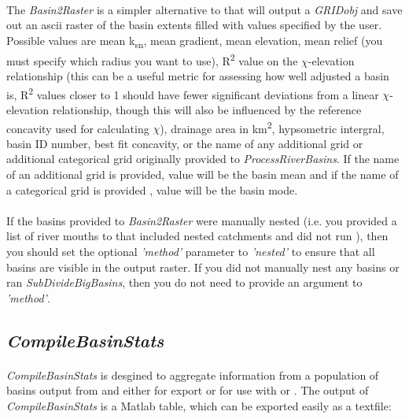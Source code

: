 \paragraph{}The \textit{Basin2Raster} is a simpler alternative to  that will output a \textit{GRIDobj} and save out an ascii raster of the basin extents filled with values specified by the user. Possible values are mean k\textsubscript{sn}, mean gradient, mean elevation, mean relief (you must specify which radius you want to use), R\textsuperscript{2} value on the $\chi$-elevation relationship (this can be a useful metric for assessing how well adjusted a basin is, R\textsuperscript{2} values closer to 1 should have fewer significant deviations from a linear $\chi$-elevation relationship, though this will also be influenced by the reference concavity used for calculating $\chi$), drainage area in km\textsuperscript{2}, hypsometric intergral, basin ID number, best fit concavity, or the name of any additional grid or additional categorical grid originally provided to \textit{ProcessRiverBasins}. If the name of an additional grid is provided, value will be the basin mean and if the name of a categorical grid is provided , value will be the basin mode. 

\paragraph{}If the basins provided to \textit{Basin2Raster} were manually nested (i.e. you provided a list of river mouths to  that included nested catchments and did not run ), then you should set the optional \textit{'method'} parameter to \textit{'nested'} to ensure that all basins are visible in the output raster. If you did not manually nest any basins or ran \textit{SubDivideBigBasins}, then you do not need to provide an argument to \textit{'method'}.

\subsection{\textit{CompileBasinStats}} \label{sec:CompStats}
\paragraph{}\textit{CompileBasinStats} is desgined to aggregate information from a population of basins output from  and  either for export or for use with  or . The output of \textit{CompileBasinStats} is a Matlab table, which can be exported easily as a textfile:

